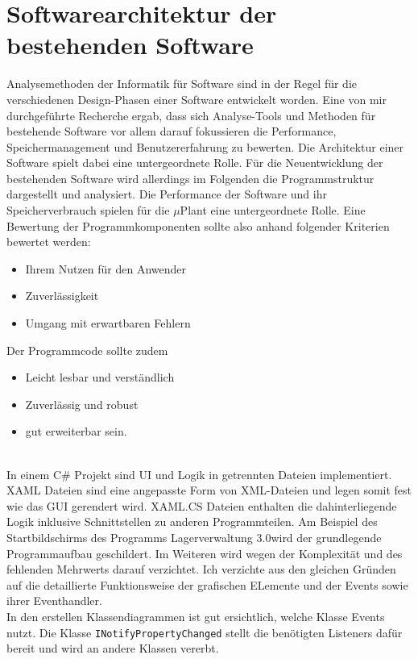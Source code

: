 

\chapter{Softwarearchitektur der bestehenden Software}

    Analysemethoden der Informatik für Software sind in der Regel für die verschiedenen Design-Phasen einer Software entwickelt worden.
    Eine von mir durchgeführte Recherche ergab, dass sich Analyse-Tools und Methoden für bestehende Software vor
    allem darauf fokussieren die Performance, Speichermanagement und Benutzererfahrung zu bewerten.
    Die Architektur einer Software spielt dabei eine untergeordnete Rolle.
    Für die Neuentwicklung der bestehenden Software wird allerdings im Folgenden die Programmstruktur dargestellt und analysiert.
    Die Performance der Software und ihr Speicherverbrauch spielen für die $\mu$Plant eine untergeordnete Rolle.
    Eine Bewertung der Programmkomponenten sollte also anhand folgender Kriterien bewertet werden:

    \begin{itemize}
        \item Ihrem Nutzen für den Anwender
        \item Zuverlässigkeit
        \item Umgang mit erwartbaren Fehlern
    \end{itemize}

    Der Programmcode sollte zudem
    \begin{itemize}
        \item Leicht lesbar und verständlich
        \item Zuverlässig und robust
        \item gut erweiterbar sein.
    \end{itemize}

    \\
    In einem C\# Projekt sind UI und Logik in getrennten Dateien implementiert.
    XAML Dateien sind eine angepasste Form von XML-Dateien und legen somit fest wie das GUI gerendert wird.
    XAML.CS Dateien enthalten die dahinterliegende Logik inklusive Schnittstellen zu anderen Programmteilen.
    Am Beispiel des Startbildschirms des Programms \glqq Lagerverwaltung 3.0\grqq wird der grundlegende Programmaufbau geschildert.
    Im Weiteren wird wegen der Komplexität und des fehlenden Mehrwerts darauf verzichtet.
    Ich verzichte aus den gleichen Gründen auf die detaillierte Funktionsweise der grafischen ELemente und der Events
    sowie ihrer Eventhandler.
    \\
    In den erstellen Klassendiagrammen ist gut ersichtlich, welche Klasse Events nutzt.
    Die Klasse \verb|INotifyPropertyChanged| stellt die benötigten Listeners dafür bereit und wird an andere Klassen vererbt.


